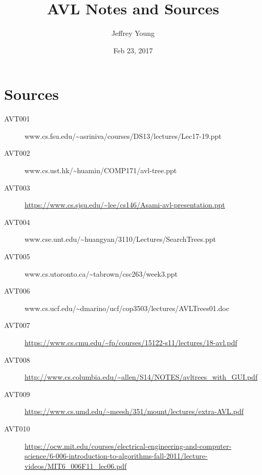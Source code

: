 \documentclass[10pt, letterpaper]{article}
\author{Jeffrey Young}
\date{Feb 23, 2017}
\title{AVL Notes and Sources}
\begin{document}
\maketitle

\section*{Sources}
\label{sec:orgdcc931d}
\begin{description}
\item[{AVT001}] www.cs.fsu.edu/\textasciitilde{}asriniva/courses/DS13/lectures/Lec17-19.ppt
\item[{AVT002}] www.cs.ust.hk/\textasciitilde{}huamin/COMP171/avl-tree.ppt
\item[{AVT003}] \url{https://www.cs.sjsu.edu/\~lee/cs146/Asami-avl-presentation.ppt}
\item[{AVT004}] www.cse.unt.edu/\textasciitilde{}huangyan/3110/Lectures/SearchTrees.ppt
\item[{AVT005}] www.cs.utoronto.ca/\textasciitilde{}tabrown/csc263/week3.ppt
\item[{AVT006}] www.cs.ucf.edu/\textasciitilde{}dmarino/ucf/cop3503/lectures/AVLTrees01.doc
\item[{AVT007}] \url{https://www.cs.cmu.edu/\~fp/courses/15122-s11/lectures/18-avl.pdf}
\item[{AVT008}] \url{http://www.cs.columbia.edu/\~allen/S14/NOTES/avltrees\_with\_GUI.pdf}
\item[{AVT009}] \url{https://www.cs.umd.edu/\~meesh/351/mount/lectures/extra-AVL.pdf}
\item[{AVT010}] \url{https://ocw.mit.edu/courses/electrical-engineering-and-computer-science/6-006-introduction-to-algorithms-fall-2011/lecture-videos/MIT6\_006F11\_lec06.pdf}
\end{description}
\end{document}
